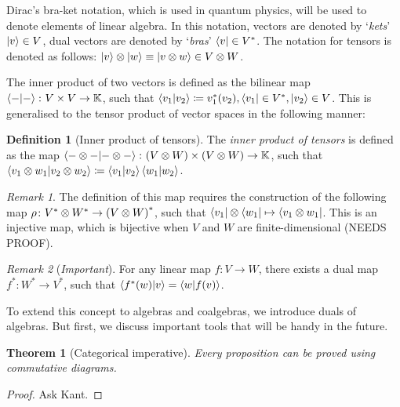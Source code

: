\documentclass{article}
\newtheorem{Theorem}{Theorem}
\theoremstyle{definition}
\newtheorem{Definition}{Definition}
\theoremstyle{remark}
\newtheorem*{Remark*}{Remark}
\theoremstyle{underline}
\theoremstyle{underline}
\begin{document}
	Dirac's bra-ket notation, which is used in quantum physics, will be used to denote elements of linear algebra. In this notation, vectors are denoted by `\emph{kets}' $\ket{v} \in V$, dual vectors are denoted by `\emph{bras}' $\bra{v} \in V^* $. The notation for tensors is denoted as follows: $\ket{v} \otimes \ket{w} \equiv \ket{v \otimes w} \in V \otimes W$.

	The inner product of two vectors is defined as the bilinear map $\braket{-}{-} \colon V \times V \to \mathbb K$, such that $\braket{v_1}{v_2} \coloneqq v_1^*(v_2), \bra{v_1} \in V^*, \ket{v_2} \in V$. This is generalised to the tensor product of vector spaces in the following manner:

	\begin{Definition}[Inner product of tensors]
		The \emph{inner product of tensors} is defined as the map $\braket{- \otimes -}{- \otimes -} \colon \pqty{V \otimes W} \times \pqty{V \otimes W} \to \mathbb K$, such that $ \braket{v_1 \otimes w_1}{v_2 \otimes w_2} \coloneqq \braket{v_1}{v_2}\braket{w_1}{w_2}$.
	\end{Definition} 

	\begin{Remark*}
		The definition of this map requires the construction of the following map $\rho \colon {V^* \otimes W^*} \to \pqty{V \otimes W}^*$, such that $\bra{v_1} \otimes \bra{w_1} \mapsto \bra{v_1 \otimes w_1}$. This is an injective map, which is bijective when $V$ and $W$ are finite-dimensional (NEEDS PROOF).
 	\end{Remark*}

 	\begin{Remark*}[\emph{Important}]
 		For any linear map $f \colon V \to W$, there exists a dual map $f^* \colon W^* \to V^*$, such that $\braket{f^*(w)}{v} = \braket{w}{f(v)}$.
 	\end{Remark*}

 	To extend this concept to algebras and coalgebras, we introduce duals of algebras. But first, we discuss important tools that will be handy in the future.

 	\begin{Theorem}[Categorical imperative]
 		Every proposition can be proved using commutative diagrams.	
 	\end{Theorem}

 	\begin{proof}
 		Ask Kant.
 	\end{proof}
 
\end{document}
